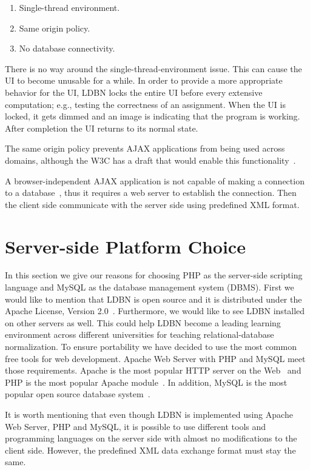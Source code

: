 \begin{enumerate}
	\item Single-thread environment.
	\item Same origin policy.
	\item No database connectivity.
\end{enumerate}

There is no way around the single-thread-environment issue. This can cause the UI
to become unusable for a while. In order to provide a more appropriate behavior 
for the UI, LDBN locks the entire UI before every extensive computation; e.g.,
testing the correctness of an assignment. When the UI is locked,
it gets dimmed and an image is indicating that the program is working. After 
completion the UI returns to its normal state. 

The same origin policy prevents AJAX applications from being used across domains,
although the W3C has a draft that would enable this functionality~\cite{bajax1}.

A browser-independent AJAX application is not capable of making a connection 
to a database~\cite{bajax1}, thus it requires a web server to establish the 
connection. Then the client side communicate with the server side using 
predefined XML format.

\section{Server-side Platform Choice}
In this section we give our reasons for choosing PHP as the server-side
scripting language and MySQL as the database management system (DBMS). First we would
like to mention that LDBN is open source and it is distributed under the 
Apache License, Version 2.0~\cite{walv2}. Furthermore, we would like to see 
LDBN installed on other servers as well. This could help LDBN become
a leading learning environment across 
different universities for teaching relational-database normalization. To ensure 
portability we have decided to use the most common free 
tools for web development. Apache Web Server with PHP and MySQL meet those requirements. 
Apache is the most popular HTTP server on the Web~\cite{w3} and PHP is the most popular 
Apache module~\cite{w4}. In addition, MySQL is the most popular open source 
database system~\cite{w5}.
 
It is worth mentioning that even though LDBN is implemented using Apache Web Server,
PHP and MySQL, it is possible to use different tools and programming languages 
on the server side with almost no modifications to the client side. However, 
the predefined XML data exchange format must stay the same.

